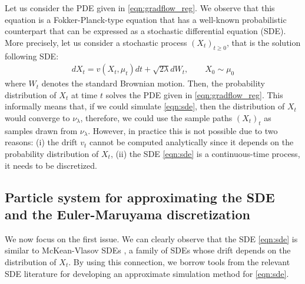 Let us consider the PDE given in \eqref{eqn:gradflow_reg}. We observe that this equation is a Fokker-Planck-type equation \cite{bogachev2015fokker} that has a well-known probabilistic counterpart that can be expressed as a stochastic differential equation (SDE). More precisely, let us consider a stochastic process $(X_t)_{t\geq0}$, that is the solution following SDE:
\begin{align}
d X_t = v(X_t,\mu_t) dt + \sqrt{2 \lambda } d W_t, \qquad X_0 \sim \mu_0 \label{eqn:sde}
\end{align}
where $W_t$ denotes the standard Brownian motion. Then, the probability distribution of $X_t$ at time $t$ solves the PDE given in \eqref{eqn:gradflow_reg}. This informally means that, if we could simulate \eqref{eqn:sde}, then the distribution of $X_t$ would converge to $\nu_\lambda$, therefore, we could use the sample paths $(X_t)_t$ as samples drawn from $\nu_\lambda$. However, in practice this is not possible due to two reasons: (i) the drift $v_t$ cannot be computed analytically since it depends on the probability distribution of $X_t$, (ii) the SDE \eqref{eqn:sde} is a continuous-time process, it needs to be discretized.  


\subsection{Particle system for approximating the SDE and the Euler-Maruyama discretization}





We now focus on the first issue. 
We can clearly observe that the SDE \eqref{eqn:sde} is similar to McKean-Vlasov SDEs \cite{veretennikov2006ergodic,mishura2016existence}, a family of SDEs whose drift depends on the distribution of $X_t$. By using this connection, we borrow tools from the relevant SDE literature \cite{malrieu03,cgm-08} for developing an approximate simulation method for \eqref{eqn:sde}. 

